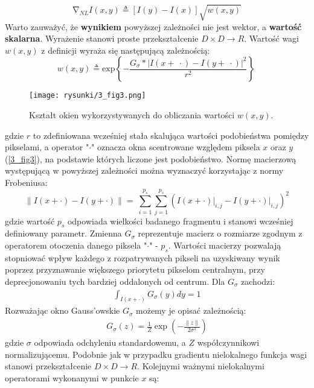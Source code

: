 \documentclass[12pt, twoside, openany]{report}
\theoremstyle{definition}
\begin{document}
\begin{equation}
{\mathrm{\nabla }}_{NL}I\left(x,y\right)\triangleq \left[I\left(y\right)-I\left(x\right)\right]\sqrt{w(x,y)}
\label{NLGRAD}
\end{equation}
Warto zauważyć, że \textbf{wynikiem} powyższej zależności nie jest wektor, a \textbf{wartość skalarna}. Wyrażenie stanowi proste przekształcenie $D \times D\longrightarrow R$. Wartość wagi $w(x,y)$ z definicji wyraża się następującą zależnością:
\begin{equation}
w\left(x,y\right)\triangleq {\mathrm{exp} \left\{-\frac{G_{\sigma }*{\left|I\left(x+\ \cdot \right)-I\left(y+\ \cdot \right)\right|}^2}{r^2}\right\}\ }
\label{NLWEIGHT}
\end{equation}
\begin{figure}[!h]
	\centering
	\texttt{[image: rysunki/3\_fig3.png]}
	\caption{Kształt okien wykorzystywanych do obliczania wartości $w(x,y)$.}
	\label{3_fig3}
\end{figure}
gdzie $r$ to zdefiniowana wcześniej stała skalująca wartości podobieństwa pomiędzy pikselami, a operator "$\cdot$" oznacza okna scentrowane względem piksela $x$ oraz $y$ (\autoref{3_fig3}), na podstawie których liczone jest podobieństwo. Normę macierzową występującą w powyższej zależności można wyznaczyć korzystając z normy Frobeniusa:
\begin{equation}
{\|I\left(x+\cdot \right)-I\left(y+\cdot \right)\|}=\ \sum^{p_s}_{i=1}{\sum^{p_s}_{j=1}{{\left(I(x+\cdot)\big|_{i,j}-I(y+\cdot)\big|_{i,j}\right)}^2}}
\label{FROBENIUS}
\end{equation}
gdzie wartość $p_s$ odpowiada wielkości badanego fragmentu i stanowi wcześniej definiowany parametr. Zmienna $G_\sigma$ reprezentuje macierz o rozmiarze zgodnym z operatorem otoczenia danego piksela "$\cdot$" - $p_s$. Wartości macierzy pozwalają stopniować wpływ każdego z rozpatrywanych pikseli na uzyskiwany wynik poprzez przyznawanie większego priorytetu pikselom centralnym, przy deprecjonowaniu tych bardziej oddalonych od centrum. Dla $G_\sigma$ zachodzi:
\begin{align}
\int_{I(x+\cdot)}G_{\sigma}(y)dy = 1
\end{align}
Rozważając okno Gauss'owskie $G_\sigma$ możemy je opisać zależnością:
\begin{align}
G_\sigma(z)=\frac{1}{Z}\exp(-\frac{\|z\|}{2\sigma^2})
\label{oknoGaussowskie}
\end{align}
gdzie $\sigma$ odpowiada odchyleniu standardowemu, a $Z$ współczynnikowi normalizującemu. Podobnie jak w przypadku gradientu nielokalnego funkcja wagi stanowi przekształcenie $D \times D\longrightarrow R$. Kolejnymi ważnymi nielokalnymi operatorami wykonanymi w punkcie $x$ są: 
\end{document}
